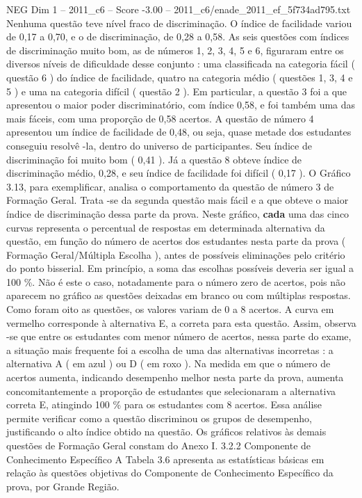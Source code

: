 \begin{textsample}{NEG Dim 1 – 2011\_c6 – Score -3.00 – 2011\_c6/enade\_2011\_ef\_5f734ad795.txt}
Nenhuma questão teve nível fraco de discriminação.
O índice de facilidade variou de 0,17 a 0,70, e o de discriminação, de 0,28 a 0,58.
As seis questões com índices de discriminação muito bom, as de números 1, 2, 3, 4, 5 e 6, figuraram entre os diversos níveis de dificuldade desse conjunto : uma classificada na categoria fácil ( questão 6 ) do índice de facilidade, quatro na categoria médio ( questões 1, 3, 4 e 5 ) e uma na categoria difícil ( questão 2 ).
Em particular, a questão 3 foi a que apresentou o maior poder discriminatório, com índice 0,58, e foi também uma das mais fáceis, com uma proporção de 0,58 acertos.
A questão de número 4 apresentou um índice de facilidade de 0,48, ou seja, quase metade dos estudantes conseguiu resolvê -la, dentro do universo de participantes.
Seu índice de discriminação foi muito bom ( 0,41 ).
Já a questão 8 obteve índice de discriminação médio, 0,28, e seu índice de facilidade foi difícil ( 0,17 ).
O Gráfico 3.13, para exemplificar, analisa o comportamento da questão de número 3 de Formação Geral.
Trata -se da segunda questão mais fácil e a que obteve o maior índice de discriminação dessa parte da prova.
Neste gráfico, \textbf{cada} uma das cinco curvas representa o percentual de respostas em determinada alternativa da questão, em função do número de acertos dos estudantes nesta parte da prova ( Formação Geral/Múltipla Escolha ), antes de possíveis eliminações pelo critério do ponto bisserial.
Em princípio, a soma das escolhas possíveis deveria ser igual a 100 \%.
Não é este o caso, notadamente para o número zero de acertos, pois não aparecem no gráfico as questões deixadas em branco ou com múltiplas respostas.
Como foram oito as questões, os valores variam de 0 a 8 acertos.
A curva em vermelho corresponde à alternativa E, a correta para esta questão.
Assim, observa -se que entre os estudantes com menor número de acertos, nessa parte do exame, a situação mais frequente foi a escolha de uma das alternativas incorretas : a alternativa A ( em azul ) ou D ( em roxo ).
Na medida em que o número de acertos aumenta, indicando desempenho melhor nesta parte da prova, aumenta concomitantemente a proporção de estudantes que selecionaram a alternativa correta E, atingindo 100 \% para os estudantes com 8 acertos.
Essa análise permite verificar como a questão discriminou os grupos de desempenho, justificando o alto índice obtido na questão.
Os gráficos relativos às demais questões de Formação Geral constam do Anexo I. 3.2.2 Componente de Conhecimento Específico A Tabela 3.6 apresenta as estatísticas básicas em relação às questões objetivas do Componente de Conhecimento Específico da prova, por Grande Região.

\end{textsample}
